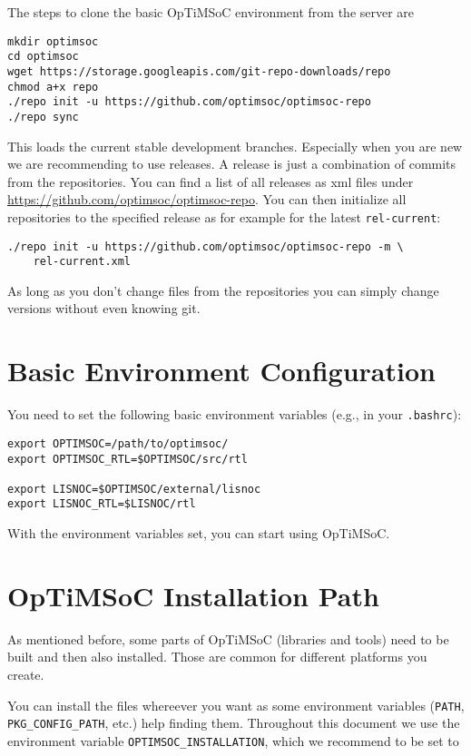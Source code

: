 The steps to clone the basic OpTiMSoC environment from the server are

\begin{lstlisting}
mkdir optimsoc
cd optimsoc
wget https://storage.googleapis.com/git-repo-downloads/repo
chmod a+x repo
./repo init -u https://github.com/optimsoc/optimsoc-repo
./repo sync
\end{lstlisting}

This loads the current stable development branches. Especially when
you are new we are recommending to use releases. A release is just a
combination of commits from the repositories. You can find a list of
all releases as xml files under
\url{https://github.com/optimsoc/optimsoc-repo}. You can then
initialize all repositories to the specified release as for example
for the latest \verb|rel-current|:

\begin{lstlisting}
./repo init -u https://github.com/optimsoc/optimsoc-repo -m \
    rel-current.xml
\end{lstlisting}

As long as you don't change files from the repositories you can simply
change versions without even knowing git.

\section{Basic Environment Configuration}


You need to set the following basic environment variables (e.g., in your
\verb|.bashrc|):

\begin{lstlisting}
export OPTIMSOC=/path/to/optimsoc/
export OPTIMSOC_RTL=$OPTIMSOC/src/rtl

export LISNOC=$OPTIMSOC/external/lisnoc
export LISNOC_RTL=$LISNOC/rtl
\end{lstlisting}

With the environment variables set, you can start using OpTiMSoC.

\section{OpTiMSoC Installation Path}

As mentioned before, some parts of OpTiMSoC (libraries and tools) need
to be built and then also installed. Those are common for different
platforms you create.

You can install the files whereever you want as some environment
variables (\verb|PATH|, \verb|PKG_CONFIG_PATH|, etc.) help finding
them. Throughout this document we use the environment variable
\verb|OPTIMSOC_INSTALLATION|, which we recommend to be set to

